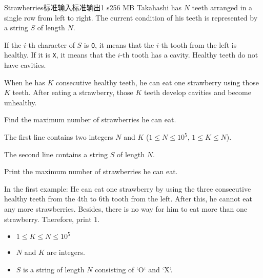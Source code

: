 \begin{problem}{Strawberries}{标准输入}{标准输出}{1 s}{256 MB}
Takahashi has $N$ teeth arranged in a single row from left to right. The current condition of his teeth is represented by a string $S$ of length $N$.

If the $i$-th character of $S$ is \texttt{O}, it means that the $i$-th tooth from the left is healthy. If it is \texttt{X}, it means that the $i$-th tooth has a cavity. Healthy teeth do not have cavities.

When he has $K$ consecutive healthy teeth, he can eat one strawberry using those $K$ teeth. After eating a strawberry, those $K$ teeth develop cavities and become unhealthy.

Find the maximum number of strawberries he can eat.

\InputFile
The first line contains two integers $N$ and $K$ ($1 \leq N \leq 10^5$, $1 \leq K \leq N$).

The second line contains a string $S$ of length $N$.

\OutputFile
Print the maximum number of strawberries he can eat.

\Example

\begin{example}
\end{example}

\Note
In the first example: He can eat one strawberry by using the three consecutive healthy teeth from the 4th to 6th tooth from the left. After this, he cannot eat any more strawberries. Besides, there is no way for him to eat more than one strawberry. Therefore, print $1$.

\Constraints
\begin{itemize}
\item $1 \leq K \leq N \leq 10^5$
\item $N$ and $K$ are integers.
\item $S$ is a string of length $N$ consisting of `O` and `X`.
\end{itemize}

\end{problem}
